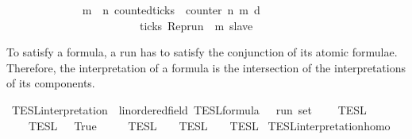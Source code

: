 \begin{isabellebody}
\ \ \ \ %
\isanewline
\ \ \ \ \ \ \ \ {\isacharbraceleft}{\isasymrho}{\isachardot}\ {\isasymforall}m\ {\isasymge}\ n{\isachardot}\ counted{\isacharunderscore}ticks\ {\isasymrho}\ counter\ n\ m\ d\isanewline
\ \ \ \ \ \ \ \ \ \ \ \ \ \ \ \ \ \ \ \ \ \ \ {\isasymlongrightarrow}\ ticks\ {\isacharparenleft}{\isacharparenleft}Rep{\isacharunderscore}run\ {\isasymrho}{\isacharparenright}\ m\ slave{\isacharparenright}{\isacharbraceright}{\isacartoucheclose}%
\isadelimdocument
%
\endisadelimdocument
%
\isatagdocument
%
\isamarkuptrue%
%
\endisatagdocument
{\isafolddocument}%
%
\isadelimdocument
%
\endisadelimdocument
%
\begin{isamarkuptext}%
To satisfy a formula, a run has to satisfy the conjunction of its atomic 
  formulae. Therefore, the interpretation of a formula is the intersection
  of the interpretations of its components.%
\end{isamarkuptext}\isamarkuptrue%
\isamarkupfalse%
\ TESL{\isacharunderscore}interpretation\ {\isacharcolon}{\isacharcolon}\ {\isacartoucheopen}{\isacharparenleft}{\isacharprime}{\isasymtau}{\isacharcolon}{\isacharcolon}linordered{\isacharunderscore}field{\isacharparenright}\ TESL{\isacharunderscore}formula\ {\isasymRightarrow}\ {\isacharprime}{\isasymtau}\ run\ set{\isacartoucheclose}\isanewline
\ \ {\isacharparenleft}{\isacartoucheopen}{\isasymlbrakk}{\isasymlbrakk}\ {\isacharunderscore}\ {\isasymrbrakk}{\isasymrbrakk}\isactrlsub T\isactrlsub E\isactrlsub S\isactrlsub L{\isacartoucheclose}{\isacharparenright}\isanewline
{}\isanewline
\ \ {\isacartoucheopen}{\isasymlbrakk}{\isasymlbrakk}\ {\isacharbrackleft}{\isacharbrackright}\ {\isasymrbrakk}{\isasymrbrakk}\isactrlsub T\isactrlsub E\isactrlsub S\isactrlsub L\ {\isacharequal}\ {\isacharbraceleft}{\isacharunderscore}{\isachardot}\ True{\isacharbraceright}{\isacartoucheclose}\isanewline
{\isacharbar}\ {\isacartoucheopen}{\isasymlbrakk}{\isasymlbrakk}\ {\isasymphi}\ {\isacharhash}\ {\isasymPhi}\ {\isasymrbrakk}{\isasymrbrakk}\isactrlsub T\isactrlsub E\isactrlsub S\isactrlsub L\ {\isacharequal}\ {\isasymlbrakk}\ {\isasymphi}\ {\isasymrbrakk}\isactrlsub T\isactrlsub E\isactrlsub S\isactrlsub L\ {\isasyminter}\ {\isasymlbrakk}{\isasymlbrakk}\ {\isasymPhi}\ {\isasymrbrakk}{\isasymrbrakk}\isactrlsub T\isactrlsub E\isactrlsub S\isactrlsub L{\isacartoucheclose}\isanewline
\isanewline
{}\isamarkupfalse%
\ TESL{\isacharunderscore}interpretation{\isacharunderscore}homo{\isacharcolon}\isanewline

\end{isabellebody}
